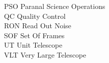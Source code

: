 \begin{tabbing}
PSO         \> Paranal Science Operations \\
QC          \> Quality Control \\
RON        \> Read Out Noise \\
SOF        \> Set Of Frames \\
UT         \> Unit Telescope \\
VLT        \> Very Large Telescope \\
\end{tabbing}




